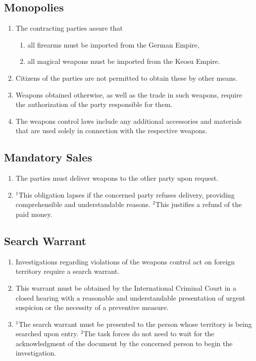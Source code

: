 \documentclass{article}
\begin{document}
\subsection{Monopolies}
\begin{enumerate}[(1)]
    \item The contracting parties assure that
    \begin{enumerate}[1.]
        \item all firearms must be imported from the German Empire,
        \item all magical weapons must be imported from the Keosu Empire.
    \end{enumerate}
    \item Citizens of the parties are not permitted to obtain these by other means.
    \item Weapons obtained otherwise, as well as the trade in such weapons, require the authorization of the party responsible for them.
    \item The weapons control laws include any additional accessories and materials that are used solely in connection with the respective weapons.
\end{enumerate}

\subsection{Mandatory Sales}
\begin{enumerate}[(1)]
    \item The parties must deliver weapons to the other party upon request.
    \item ${^1}$This obligation lapses if the concerned party refuses delivery, providing comprehensible and understandable reasons. ${^2}$This justifies a refund of the paid money.
\end{enumerate}

\subsection{Search Warrant}
\begin{enumerate}[(1)]
    \item Investigations regarding violations of the weapons control act on foreign territory require a search warrant.
    \item This warrant must be obtained by the International Criminal Court in a closed hearing with a reasonable and understandable presentation of urgent suspicion or the necessity of a preventive measure.
    \item ${^1}$The search warrant must be presented to the person whose territory is being searched upon entry. ${^2}$The task forces do not need to wait for the acknowledgment of the document by the concerned person to begin the investigation.
\end{enumerate}
\end{document}
